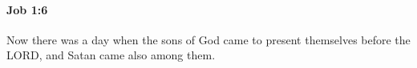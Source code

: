
		\paragraph{Job 1:6} %
			\label{JOB-1-6}

			Now there was a day when the sons of God came to present themselves before the LORD, and Satan came also among them.


